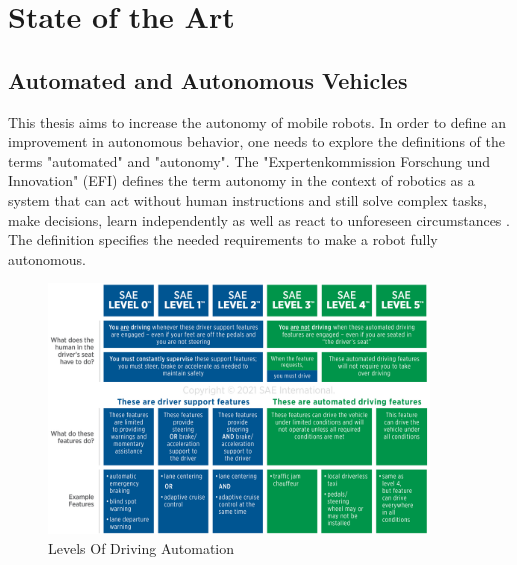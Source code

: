 \chapter{State of the Art}
\label{cha:state of the art}

\section{Automated and Autonomous Vehicles}

This thesis aims to increase the autonomy of mobile robots. In order to define an improvement in autonomous behavior, one needs to explore the definitions of the terms "automated" and "autonomy". The "Expertenkommission Forschung und Innovation" (EFI) defines the term autonomy in the context of robotics as a system that can act without human instructions and still solve complex tasks, make decisions, learn independently as well as react to unforeseen circumstances \cite{efi2018}. The definition specifies the needed requirements to make a robot fully autonomous.

\begin{figure}[ht]
	\centering
	\includegraphics[width=0.9\textwidth]{images/j3016graphic_2021.png}
	\caption{Levels Of Driving Automation \cite{J3016_202104}}
	\label{fig:sae_levels}
\end{figure}

